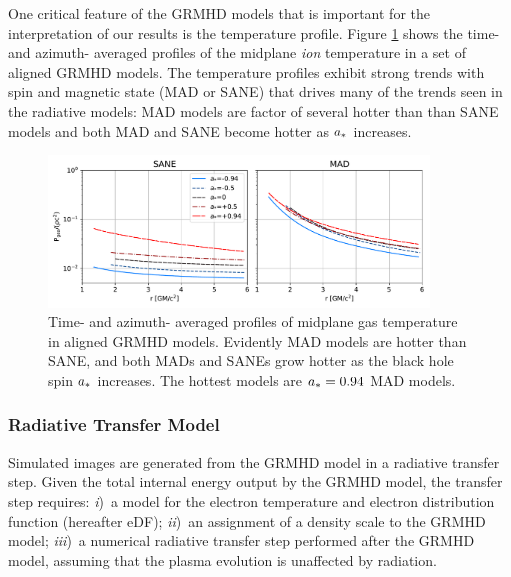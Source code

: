One critical feature of the GRMHD models that is important for the interpretation of our results is the temperature profile.  Figure \ref{fig:grmhd_temp} shows the time- and azimuth- averaged profiles of the midplane {\em ion} temperature in a set of aligned GRMHD models.  The temperature profiles exhibit strong trends with spin and magnetic state (MAD or SANE) that drives many of the trends seen in the radiative models: MAD models are factor of several hotter than than SANE models and both MAD and SANE become hotter as $a_*$ increases.

\begin{figure}
  \centering
  \includegraphics[width=0.9\textwidth]{figures/grmhd_temp.pdf}
  \caption{Time- and azimuth- averaged profiles of midplane gas temperature in aligned GRMHD models.  Evidently MAD models are hotter than SANE, and both MADs and SANEs grow hotter as the black hole spin $a_*$ increases.  The hottest models are $a_* = 0.94$ MAD models.}
  \label{fig:grmhd_temp}
\end{figure}

\subsubsection{Radiative Transfer Model}

Simulated images are generated from the GRMHD model in a radiative transfer step.
Given the total internal energy output by the GRMHD model, the transfer step requires: %
\emph{i})~a model for the electron temperature and electron distribution function (hereafter eDF);
\emph{ii})~an assignment of a density scale to the GRMHD model;
\emph{iii})~a numerical radiative transfer step performed after the GRMHD model, assuming that the plasma evolution is unaffected by radiation.

\label{sec:eDF}

